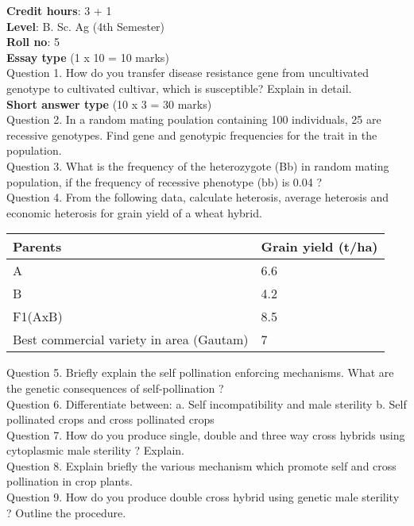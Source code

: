 \documentclass[12pt]{article}\usepackage[]{graphicx}\usepackage[]{color}
\begin{document}
\textbf{Credit hours}: 3 + 1 \\ 
\textbf{Level}: B. Sc. Ag (4th Semester) \\
\textbf{Roll no}: 5 \\[0.5cm] 
\textbf{Essay type} (1 x 10 = 10 marks) \\
Question 1. How do you transfer disease resistance gene from uncultivated genotype to cultivated cultivar, which is susceptible? Explain in detail.\\
\textbf{Short answer type} (10 x 3 = 30 marks) \\
Question 2. In a random mating poulation containing 100 individuals, 25 are recessive genotypes. Find gene and genotypic frequencies for the trait in the population.\\
Question 3. What is the frequency of the heterozygote (Bb) in random mating population, if the frequency of recessive phenotype (bb) is 0.04 ?\\
Question 4. From the following data, calculate heterosis, average heterosis and economic heterosis for grain yield of a wheat hybrid.\\ 
\begin{table}[H]
\centering\begingroup\fontsize{8}{10}\selectfont

\begin{tabular}[t]{ll}
\toprule
Parents & Grain yield (t/ha)\\
\midrule
A & 6.6\\
B & 4.2\\
F1(AxB) & 8.5\\
Best commercial variety in area (Gautam) & 7\\
\bottomrule
\end{tabular}
\endgroup{}
\end{table}
Question 5. Briefly explain the self pollination enforcing mechanisms. What are the genetic consequences of self-pollination ?\\
Question 6. Differentiate between: a. Self incompatibility and male sterility b. Self pollinated crops and cross pollinated crops\\
Question 7. How do you produce single, double and three way cross hybrids using cytoplasmic male sterility ? Explain.\\
Question 8. Explain briefly the various mechanism which promote self and cross pollination in crop plants.\\
Question 9. How do you produce double cross hybrid using genetic male sterility ? Outline the procedure.\\
\end{document}

